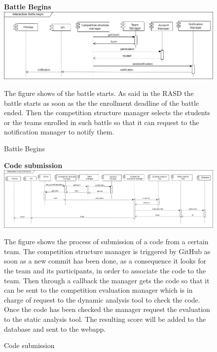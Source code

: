 \begin{enumerate}[label=\textbf{[UC\arabic*]}]
    \begin{figure}
    \item \textbf{Battle Begins}
        \centering
        \includegraphics[width= \textwidth]{Images/Battle_begin.jpg}
        \caption{Battle Begins}
        \label{fig:enter-label}
        \raggedright The figure shows of the battle starts. As said in the RASD the battle starts as soon as the the enrollment deadline of the battle ended. Then the competition structure manager selects the students or the teams enrolled in such battle so that it can request to the notification manager to notify them.
    \end{figure}
    
    \begin{figure}
    \item \textbf{Code submission}
        \centering
        \includegraphics[width= \textwidth]{Images/Submits_code.jpg}
        \caption{Code submission}
        \label{fig:enter-label}
        \raggedright The figure shows the process of submission of a code from a certain team. The competition structure manager is triggered by GitHub as soon as a new commit has been done, as a consequence it looks for the team and its participants, in order to associate the code to the team. Then through a callback the manager gets the code so that it can be sent to the competition evaluation manager which is in charge of request to the dynamic analysis tool to check the code. Once the code has been checked the manager request the evaluation to the static analysis tool. The resulting score will be added to the database and sent to the webapp.
    \end{figure}


\end{enumerate}
